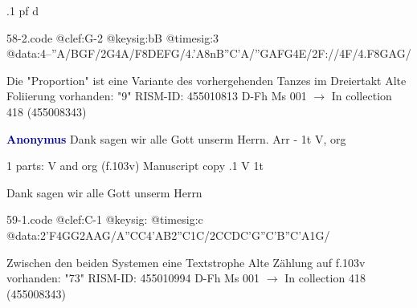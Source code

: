 \documentclass[twocolumn]{book}
\begin{document}
.1  pf  d  
\begin{filecontents*}{58-2.code}
@clef:G-2
@keysig:bB
@timesig:3
@data:4--''A/BGF/2G4A/F{8DEFG}/4.'A{8nB''C'A}/{''GAFG}4E/2F://4F/4.F{8GAG}/
\end{filecontents*}
\newline
%

\newline Die "Proportion" ist eine Variante des vorhergehenden Tanzes im Dreiertakt
\newline Alte Foliierung vorhanden: "9"
\newline RISM-ID: 455010813
\newline D-Fh  Ms 001
\newline $\rightarrow$ In collection 418 (455008343)
      
\newline \par \vspace{7pt} \textcolor{darkblue}{\textbf{Anonymus  }}
\newline Dank sagen wir alle Gott unserm Herrn. Arr - 1t
\newline V, org
\newline \begin{itshape}\end{itshape} 
\newline \textcolor{darkblue}{}  1 parts: V and org  (f.103v)
\newline Manuscript copy
.1  V  1t
\newline \begin{footnotesize} Dank sagen wir alle Gott unserm Herrn \end{footnotesize}  
\begin{filecontents*}{59-1.code}
@clef:C-1
@keysig:
@timesig:c
@data:2'F4GG2AAG/A''CC4'AB2''C1C/2CCDC'G''C'B''C'A1G/
\end{filecontents*}
\newline
%

\newline Zwischen den beiden Systemen eine Textstrophe
\newline Alte Zählung auf f.103v vorhanden: "73"
\newline RISM-ID: 455010994
\newline D-Fh  Ms 001
\newline $\rightarrow$ In collection 418 (455008343)
      
\end{document}

